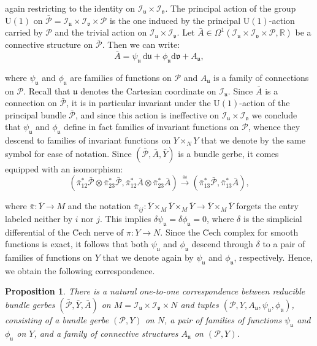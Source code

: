 \documentclass[10pt,a4paper,twoside,reqno]{amsart}
\theoremstyle{plain}
\newtheorem{prop}[thm]{Proposition}
\theoremstyle{definition}
\theoremstyle{remark}
\def\dd{\mathrm{d}}
\def\U{\mathrm{U}}
\def\cI{\mathcal{I}}
\def\cP{\mathcal{P}}
\def\cP{\mathcal{P}}
\def\dd{\mathrm{d}}
\def\fru{\mathfrak{u}}
\def\frv{\mathfrak{v}}
\begin{document}
\noindent
again restricting to the identity on $\cI_{\fru}\times \cI_{\frv}$. The principal action of the group $\U(1)$ on $\bar{\cP} = \cI_{\fru}\times \cI_{\frv} \times \cP$ is the one induced by the principal $\U(1)$-action carried by $\cP$ and the trivial action on $\cI_{\fru}\times \cI_{\frv}$. Let $\bar{A} \in \Omega^1(\cI_{\fru}\times \cI_{\frv}\times \cP , \mathbb{R})$ be a connective structure on $\bar{\cP}$. Then we can write:
\begin{equation*}
\bar{A} = \psi_{\fru} \, \dd \fru + \phi_{\fru} \dd \frv  + A_{\fru},
\end{equation*}

\noindent
where $\psi_{\fru}$ and $\phi_{\fru}$ are families of functions on $\cP$ and $A_{\fru}$ is a family of connections on $\cP$. Recall that $\fru$ denotes the Cartesian coordinate on $\cI_{\fru}$. Since $\bar{A}$ is a connection on $\bar{\cP}$, it is in particular invariant under the $\U(1)$-action of the principal bundle $\bar{\cP}$, and since this action is ineffective on $\cI_{\fru}\times \cI_{\frv}$ we conclude that $\psi_{\fru}$ and $\phi_{\fru}$ define in fact families of invariant functions on $\cP$, whence they descend to families of invariant functions on $Y\times_{N} Y$ that we denote by the same symbol for ease of notation. Since $(\bar{\cP} , \bar{A}, \bar{Y})$ is a bundle gerbe, it comes equipped with an isomorphism:
\begin{equation*}
(\bar{\pi}^{\ast}_{12}\bar{\cP}\otimes\bar{\pi}^{\ast}_{23}\bar{\cP} , \bar{\pi}^{\ast}_{12}\bar{A}\otimes \bar{\pi}^{\ast}_{23}\bar{A})  \xrightarrow{\cong} (\bar{\pi}^{\ast}_{13} \bar{\cP} , \bar{\pi}^{\ast}_{13}\bar{A}),
\end{equation*}

\noindent
where $\bar{\pi}\colon \bar{Y} \to M$ and the notation $\bar{\pi}_{ij} \colon \bar{Y}\times_M \bar{Y}\times_M \bar{Y} \to \bar{Y}\times_M \bar{Y}$ forgets the entry labeled neither by $i$ nor $j$. This implies $\delta \psi_{\fru} = \delta \phi_{\fru} = 0$, where $\delta$ is the simplicial differential of the \u{C}ech nerve of $\pi\colon Y \to N$. Since the \u{C}ech complex for smooth functions is exact, it follows that both $\psi_{\fru}$ and $\phi_{\fru}$ descend through $\delta$ to a pair of families of functions on $Y$ that we denote again by $\psi_{\fru}$ and $\phi_{\fru}$, respectively. Hence, we obtain the following correspondence. 

\begin{prop}
There is a natural one-to-one correspondence between reducible bundle gerbes $(\bar{\cP},\bar{Y},\bar{A})$ on $M = \cI_{\fru}\times \cI_{\frv} \times N$ and tuples $(\cP,Y,A_{\fru} , \psi_{\fru} , \phi_{\fru})$, consisting of a bundle gerbe $(\cP,Y)$ on $N$, a pair of families of functions $\psi_{\fru}$ and $\phi_{\fru}$ on $Y$, and a family of connective structures $A_{\fru}$ on $(\cP,Y)$.
\end{prop} 
\end{document}
